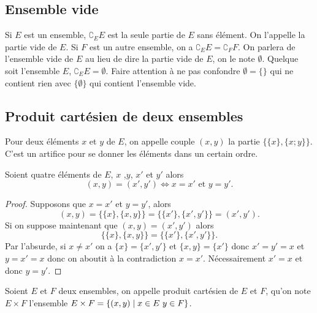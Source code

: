 \subsection{Ensemble vide}
\label{chap3-subsec:ensemblevide}

Si \(E\) est un ensemble, \(\complement_E E\) est la seule partie de \(E\) sans 
élément. On l'appelle la partie vide de \(E\). Si \(F\) est un autre ensemble, 
on a \(\complement_E E = \complement_F F\). On parlera de l'ensemble vide de 
\(E\) au lieu de dire la partie vide de \(E\), on le note \(\emptyset\). Quelque 
soit l'ensemble \(E\), \(\complement_E E  = \emptyset\).
Faire attention à ne pas confondre \(\emptyset = \{\}\) qui ne contient rien 
avec \(\{\emptyset\}\) qui contient l'ensemble vide.

\subsection{Produit cartésien de deux ensembles}
\label{chap3-subsec:prodcart}

\begin{defdef}
  Pour deux éléments \(x\) et \(y\) de \(E\), on appelle couple \((x,y)\) la 
  partie \(\{\{x\},\{x;y\}\}\). C'est un artifice pour se donner les éléments dans 
  un certain ordre.
\end{defdef}

\begin{prop}
  Soient quatre éléments de \(E\), \(x\) ,\(y\), \(x'\) et \(y'\) alors 
  \begin{equation} 
    (x,y) = (x',y') \iff  x = x' \text{~et~} y = y'.
  \end{equation}
\end{prop}
\begin{proof}
  Supposons que \(x = x'\) et \(y = y'\), alors 
  \begin{equation*}
    (x,y) = \{\{x\},\{x,y\}\} = \{\{x'\},\{x',y'\}\} = (x',y').
  \end{equation*}
  Si on suppose maintenant que \((x,y) = (x',y')\) alors 
  \begin{equation*}
    \{\{x\},\{x,y\}\} = \{\{x'\},\{x',y'\}\}.
  \end{equation*}
  Par l'absurde, si \(x \neq x'\) on a \(\{x\} = \{x',y'\}\) et \(\{x,y\} = \{x'\}\) 
  donc \(x'=y' = x\) et \(y = x' = x\) donc on aboutit à la contradiction \(x = x'\). 
  Nécessairement \(x' = x\) et donc \(y = y'\).
\end{proof}

\begin{defdef}
  Soient \(E\) et \(F\) deux ensembles, on appelle produit cartésien de \(E\) et 
  \(F\), qu'on note \(E \times F\) l'ensemble $E \times F = \left\{(x,y)\mathrel{}\middle|\mathrel{}x \in E 
  \ y \in F\right\}$.
\end{defdef}

